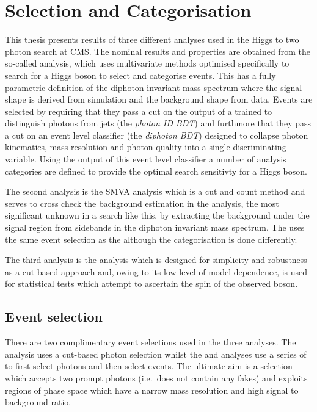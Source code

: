 \chapter{Selection and Categorisation}
\label{chap:selection_and_categorisation}

This thesis presents results of three different analyses used in the Higgs to two photon search at CMS. The nominal results and properties are obtained from the so-called \MFM analysis, which uses multivariate methods optimised specifically to search for a \SM Higgs boson to select and categorise events. This has a fully parametric definition of the diphoton invariant mass spectrum where the signal shape is derived from \MC simulation and the background shape from data. Events are selected by requiring that they pass a cut on the output of a \BDT trained to distinguish photons from jets (the \textit{photon ID BDT}) and furthmore that they pass a cut on an event level classifier (the \textit{diphoton BDT}) designed to collapse photon kinematics, mass resolution and photon quality into a single discriminating variable. Using the output of this event level classifier a number of analysis categories are defined to provide the optimal search sensitivty for a \SM Higgs boson. 

The second analysis is the \acf{SMVA} analysis which is a cut and count method and serves to cross check the background estimation in the \MFM analysis, the most significant unknown in a search like this, by extracting the background under the signal region from sidebands in the diphoton invariant mass spectrum. The \SMVA uses the same event selection as the \MFM although the categorisation is done differently. 

The third analysis is the \CiC analysis which is designed for simplicity and robustness as a cut based approach and, owing to its low level of model dependence, is used for statistical tests which attempt to ascertain the spin of the observed boson.

\section{Event selection}
\label{sec:event_selection}

There are two complimentary event selections used in the three analyses. The \CiC analysis uses a cut-based photon selection whilst the \MFM and \SMVA analyses use a series of \BDTs to first select photons and then select events. The ultimate aim is a selection which accepts two prompt photons (i.e.\ does not contain any fakes) and exploits regions of phase space which have a narrow mass resolution and high signal to background ratio.

